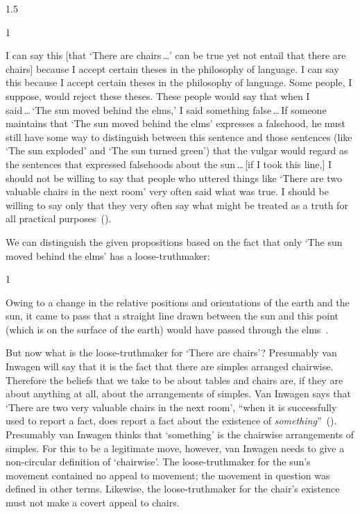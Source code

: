 \documentclass[11pt]{article}
\newenvironment{squote}{%
	\begin{spacing}{1}
	\begin{list}{}{%
	\setlength{\labelwidth}{0pt}%
	\rightmargin\leftmargin%
	}
	\item\relax
	}{%
	\end{list}%
	\end{spacing}
	}
\begin{document}
\begin{spacing}{1.5}
\begin{squote}
I can say this [that `There are chairs\,\ldots ' can be true yet not
  entail that there are chairs] because I accept certain theses in the
philosophy of language.  I can say this because I accept certain
theses in the philosophy of language.  Some people, I suppose, would
reject these theses.  These people would say that when I
said\,\ldots\,`The sun moved behind the elms,' I said something
false\,\ldots\,If someone maintains that `The sun moved behind the
elms' expresses a falsehood, he must still have some way to
distinguish between this sentence and those sentences (like `The sun
exploded' and `The sun turned green') that the vulgar would regard as
the sentences that expressed falsehoods about the sun\,\ldots\,[if I
  took this line,] I should not be willing to say that people who
uttered things like `There are two valuable chairs in the next room'
very often said what was true.  I should be willing to say only that
they very often say what might be treated as a truth for all practical
purposes~(\citeyear[102--103]{inwagen1995}).
\end{squote}
We can distinguish the given propositions based on the fact that only
`The sun moved behind the elms' has a loose-truthmaker:
\begin{squote}
Owing to a change in the relative positions and orientations of the
earth and the sun, it came to pass that a straight line drawn between
the sun and this point (which is on the surface of the earth) would
have passed through the elms~\citep[112--113]{inwagen1995}.
\end{squote}

But now what is the loose-truthmaker for `There are chairs'?
Presumably van Inwagen will say that it is the fact that there are
simples arranged chairwise.  Therefore the beliefs that we take to be
about tables and chairs are, if they are about anything at all, about
the arrangements of simples.  Van Inwagen says that `There are two
very valuable chairs in the next room', ``when it is successfully used
to report a fact, does report a fact about the existence of {\em
  something}''~(\citeyear[102]{inwagen1995}).  Presumably van Inwagen
thinks that `something' is the chairwise arrangements of simples.  For
this to be a legitimate move, however, van Inwagen needs to give a
non-circular definition of `chairwise'.  The loose-truthmaker for the
sun's movement contained no appeal to movement; the movement in
question was defined in other terms.  Likewise, the loose-truthmaker
for the chair's existence must not make a covert appeal to chairs.


\end{spacing}
\end{document}
